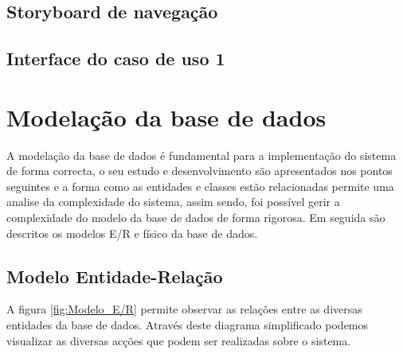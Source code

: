 \subsection{Storyboard de navegação}


\subsection{Interface do caso de uso 1}


\section{Modelação da base de dados}

A modelação da base de dados é fundamental para a implementação do sistema de forma correcta, o seu estudo e desenvolvimento são apresentados nos pontos seguintes e a forma como as entidades e classes estão relacionadas permite uma analise da complexidade do sistema, assim sendo, foi possível gerir a complexidade do modelo da base de dados de forma rigorosa. Em seguida são descritos os modelos E/R e físico da base de dados.

\subsection{Modelo Entidade-Relação}

A figura \ref{fig:Modelo_E/R} permite observar as relações entre as diversas entidades da base de dados. Através deste diagrama simplificado podemos visualizar as diversas acções que podem ser realizadas sobre o sistema.

